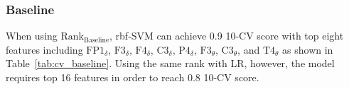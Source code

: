 \documentclass[pdflatex,sn-mathphys]{sn-jnl}%
\theoremstyle{thmstyleone}%
\theoremstyle{thmstyletwo}%
\theoremstyle{thmstylethree}%
\begin{document}

\subsubsection{Baseline}

When using $\text{Rank}_{\text{Baseline}}$, rbf-SVM can achieve 0.9 10-CV score with top eight features including $\text{FP1}_{\delta}$, $\text{F3}_{\delta}$, $\text{F4}_{\delta}$, $\text{C3}_{\delta}$, $\text{P4}_{\delta}$, $\text{F3}_{\theta}$, $\text{C3}_{\theta}$, and $\text{T4}_{\theta}$ as shown in Table~\ref{tab:cv_baseline}. Using the same rank with LR, however, the model requires top 16 features in order to reach 0.8 10-CV score. 
\end{document}
